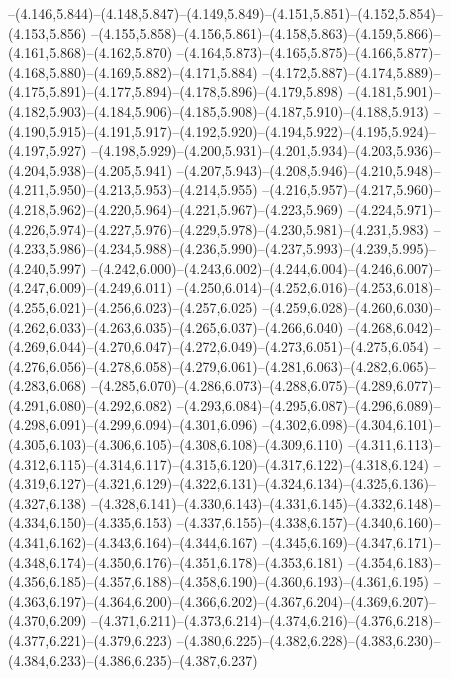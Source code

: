   --(4.146,5.844)--(4.148,5.847)--(4.149,5.849)--(4.151,5.851)--(4.152,5.854)--(4.153,5.856)%
  --(4.155,5.858)--(4.156,5.861)--(4.158,5.863)--(4.159,5.866)--(4.161,5.868)--(4.162,5.870)%
  --(4.164,5.873)--(4.165,5.875)--(4.166,5.877)--(4.168,5.880)--(4.169,5.882)--(4.171,5.884)%
  --(4.172,5.887)--(4.174,5.889)--(4.175,5.891)--(4.177,5.894)--(4.178,5.896)--(4.179,5.898)%
  --(4.181,5.901)--(4.182,5.903)--(4.184,5.906)--(4.185,5.908)--(4.187,5.910)--(4.188,5.913)%
  --(4.190,5.915)--(4.191,5.917)--(4.192,5.920)--(4.194,5.922)--(4.195,5.924)--(4.197,5.927)%
  --(4.198,5.929)--(4.200,5.931)--(4.201,5.934)--(4.203,5.936)--(4.204,5.938)--(4.205,5.941)%
  --(4.207,5.943)--(4.208,5.946)--(4.210,5.948)--(4.211,5.950)--(4.213,5.953)--(4.214,5.955)%
  --(4.216,5.957)--(4.217,5.960)--(4.218,5.962)--(4.220,5.964)--(4.221,5.967)--(4.223,5.969)%
  --(4.224,5.971)--(4.226,5.974)--(4.227,5.976)--(4.229,5.978)--(4.230,5.981)--(4.231,5.983)%
  --(4.233,5.986)--(4.234,5.988)--(4.236,5.990)--(4.237,5.993)--(4.239,5.995)--(4.240,5.997)%
  --(4.242,6.000)--(4.243,6.002)--(4.244,6.004)--(4.246,6.007)--(4.247,6.009)--(4.249,6.011)%
  --(4.250,6.014)--(4.252,6.016)--(4.253,6.018)--(4.255,6.021)--(4.256,6.023)--(4.257,6.025)%
  --(4.259,6.028)--(4.260,6.030)--(4.262,6.033)--(4.263,6.035)--(4.265,6.037)--(4.266,6.040)%
  --(4.268,6.042)--(4.269,6.044)--(4.270,6.047)--(4.272,6.049)--(4.273,6.051)--(4.275,6.054)%
  --(4.276,6.056)--(4.278,6.058)--(4.279,6.061)--(4.281,6.063)--(4.282,6.065)--(4.283,6.068)%
  --(4.285,6.070)--(4.286,6.073)--(4.288,6.075)--(4.289,6.077)--(4.291,6.080)--(4.292,6.082)%
  --(4.293,6.084)--(4.295,6.087)--(4.296,6.089)--(4.298,6.091)--(4.299,6.094)--(4.301,6.096)%
  --(4.302,6.098)--(4.304,6.101)--(4.305,6.103)--(4.306,6.105)--(4.308,6.108)--(4.309,6.110)%
  --(4.311,6.113)--(4.312,6.115)--(4.314,6.117)--(4.315,6.120)--(4.317,6.122)--(4.318,6.124)%
  --(4.319,6.127)--(4.321,6.129)--(4.322,6.131)--(4.324,6.134)--(4.325,6.136)--(4.327,6.138)%
  --(4.328,6.141)--(4.330,6.143)--(4.331,6.145)--(4.332,6.148)--(4.334,6.150)--(4.335,6.153)%
  --(4.337,6.155)--(4.338,6.157)--(4.340,6.160)--(4.341,6.162)--(4.343,6.164)--(4.344,6.167)%
  --(4.345,6.169)--(4.347,6.171)--(4.348,6.174)--(4.350,6.176)--(4.351,6.178)--(4.353,6.181)%
  --(4.354,6.183)--(4.356,6.185)--(4.357,6.188)--(4.358,6.190)--(4.360,6.193)--(4.361,6.195)%
  --(4.363,6.197)--(4.364,6.200)--(4.366,6.202)--(4.367,6.204)--(4.369,6.207)--(4.370,6.209)%
  --(4.371,6.211)--(4.373,6.214)--(4.374,6.216)--(4.376,6.218)--(4.377,6.221)--(4.379,6.223)%
  --(4.380,6.225)--(4.382,6.228)--(4.383,6.230)--(4.384,6.233)--(4.386,6.235)--(4.387,6.237)%
